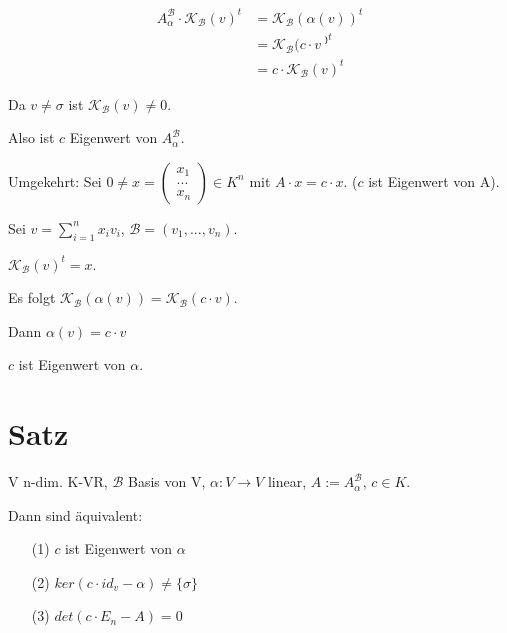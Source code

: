 \documentclass[a4paper, openany]{book}
\begin{document}
        \begin{align*}
        A_{\alpha}^{\mathcal{B}} \cdot \mathcal{K}_{\mathcal{B}}(v)^t & = \mathcal{K}_{\mathcal{B}}(\alpha(v))^t \\
                                                                      & = \mathcal{K}_{\mathcal{B}}(c \cdot v⁾^t \\
                                                                      & = c \cdot \mathcal{K}_{\mathcal{B}}(v)^t
        \end{align*}

        Da $v \neq \sigma$ ist $\mathcal{K}_{\mathcal{B}}(v) \neq 0$.

        Also ist $c$ Eigenwert von $A_{\alpha}^{\mathcal{B}}$.

        Umgekehrt: Sei $0 \neq x = \begin{pmatrix}x_1 \\ ... \\ x_n \end{pmatrix} \in K^n$ mit $A \cdot x = c \cdot x$. ($c$ ist Eigenwert von A).

        \par \medskip

        \par \medskip

        Sei $v = \sum_{i=1}^n x_i v_i$, $\mathcal{B} = (v_1, ..., v_n)$.

        $\mathcal{K}_{\mathcal{B}}(v)^t = x$.

        Es folgt $\mathcal{K}_{\mathcal{B}}(\alpha(v)) = \mathcal{K}_{\mathcal{B}}(c \cdot v)$. 

        \par \medskip

        Dann $\alpha(v) = c \cdot v$

        $c$ ist Eigenwert von $\alpha$.

        \section{Satz}

        V n-dim. K-VR, $\mathcal{B}$ Basis von V, $\alpha: V \rightarrow V$ linear, $A := A_{\alpha}^{\mathcal{B}}$, $c \in K$.

        Dann sind äquivalent:

        \begin{itemize}
          \item[(1)] $c$ ist Eigenwert von $\alpha$
          \item[(2)] $ker(c \cdot id_v - \alpha) \neq \{\sigma\}$
          \item[(3)] $det(c \cdot E_n -A) = 0$
        \end{itemize}
\end{document}
